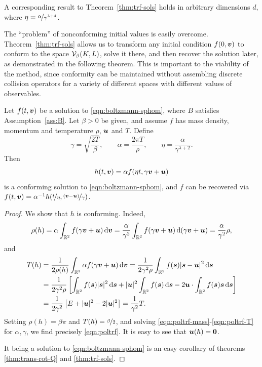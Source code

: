 \begin{remark}
    A corresponding result to Theorem~\ref{thm:trf-sols} holds in arbitrary dimensions $d$, where
    $\eta=\nicefrac{\alpha}{\gamma^{\lambda+d}}$.
\end{remark}
The ``problem'' of nonconforming initial values is easily overcome. Theorem~\ref{thm:trf-sols} allows us to
transform any initial condition $f(0,{\bm v})$ to conform to the space $\mathcal{V}_\beta(K,L)$, solve it there, and then
recover the solution later, as demonstrated in the following theorem. This is important to the viability of
the method, since conformity can be maintained without assembling discrete collision operators for a variety
of different spaces with different values of observables.
\begin{theorem} \label{thm:conf-sols}
    Let $f(t,{\bm v})$ be a solution to \eqref{eqn:boltzmann-sphom}, where $B$ satisfies Assumption~\ref{ass:B}.
    Let $\beta>0$ be given, and assume $f$ has mass density, momentum and temperature $\rho$, ${\bm u}$ and $T$. 
    Define
    \begin{equation} \label{eqn:poltrf}
        \gamma = \sqrt{\frac{2T}{\beta}}, \qquad
        \alpha = \frac{2\pi T}{\rho}, \qquad
        \eta   = \frac{\alpha}{\gamma^{\lambda+2}}.
    \end{equation}
    Then 
    \[
        h(t,{\bm v})=\alpha f(\eta t, \gamma{\bm v} + {\bm u})
    \]
    is a conforming solution to \eqref{eqn:boltzmann-sphom}, and $f$ can be recovered via $f(t,{\bm v}) =
    \alpha^{-1} h(\nicefrac{t}{\eta}, \nicefrac{({\bm v}-{\bm u})}{\gamma})$.
\end{theorem}
\begin{proof}
    We show that $h$ is conforming. Indeed,
    \begin{equation} \label{eqn:poltrf-mass}
        \rho(h) = \alpha\int_{\mathbb{R}^2} f(\gamma{\bm v}+{\bm u}) \,\mathrm{d}{\bm v} 
        = \frac{\alpha}{\gamma^2}\int_{\mathbb{R}^2} f(\gamma{\bm v}+{\bm u}) \,\mathrm{d}(\gamma{\bm v}+{\bm u})
        = \frac{\alpha}{\gamma^2}\rho,
    \end{equation}
    and
    \begin{align}
        \nonumber T(h) &= \frac{1}{2\rho(h)} \int_{\mathbb{R}^2} \alpha f(\gamma{\bm v}+{\bm u}) \,\mathrm{d}{\bm v}
        = \frac{1}{2\gamma^2\rho}\int_{\mathbb{R}^2} f({\bm s})|{\bm s}-{\bm u}|^2\,\mathrm{d}{\bm s} \\
        \nonumber &= \frac{1}{2\gamma^2\rho}\left[ \int_{\mathbb{R}^2}f({\bm s})|{\bm s}|^2\,\mathrm{d}{\bm s} +
           |{\bm u}|^2\int_{\mathbb{R}^2}f({\bm s})\,\mathrm{d}{\bm s} - 2{\bm u}\cdot\int_{\mathbb{R}^2}f({\bm s}){\bm s}\,\mathrm{d}{\bm s}\right] \\
        &= \frac{1}{2\gamma^2}\left[E + |{\bm u}|^2 - 2|{\bm u}|^2\right] = \frac{1}{\gamma^2}T.
        \label{eqn:poltrf-T}
    \end{align}
    Setting $\rho(h)=\beta\pi$ and $T(h)=\nicefrac{\beta}{2}$, and solving
    \eqref{eqn:poltrf-mass}-\eqref{eqn:poltrf-T} for $\alpha,\gamma$, we find precisely \eqref{eqn:poltrf}. It
    is easy to see that ${\bm u}(h)={\bm0}$. 
    
    It being a solution to \eqref{eqn:boltzmann-sphom} is an easy corollary of theorems \ref{thm:trans-rot-Q}
    and \ref{thm:trf-sols}.
\end{proof}

